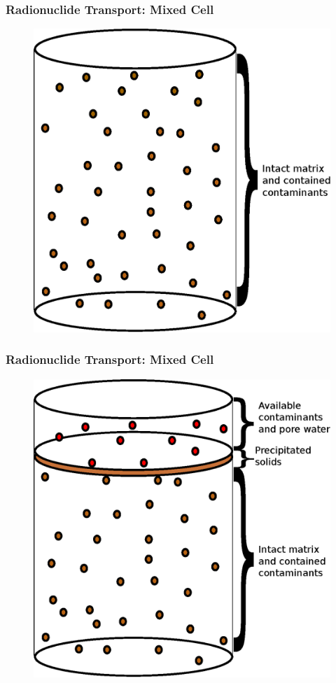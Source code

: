 \begin{frame}
  \frametitle{Radionuclide Transport: Mixed Cell}
  \begin{figure}[h!]
    \begin{center}
      \includegraphics[height=.6\textwidth]{cyder/images/mixed_cell_whole.eps}
    \end{center}
  \end{figure}
\end{frame}

\begin{frame}[ctb!]
  \frametitle{Radionuclide Transport: Mixed Cell}
  \begin{figure}[h!]
    \begin{center}
      \includegraphics[height=.6\textwidth]{cyder/images/mixed_cell_degraded.eps}
    \end{center}
  \end{figure}
\end{frame}



